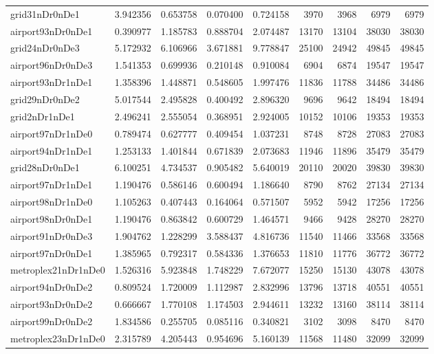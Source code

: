 \begin{longtable}{|l|r|r|r|r|r|r|r|r|}
grid31nDr0nDe1 & 3.942356 & 0.653758 & 0.070400 & 0.724158 & 3970 & 3968 & 6979 & 6979 \\
airport93nDr0nDe1 & 0.390977 & 1.185783 & 0.888704 & 2.074487 & 13170 & 13104 & 38030 & 38030 \\
grid24nDr0nDe3 & 5.172932 & 6.106966 & 3.671881 & 9.778847 & 25100 & 24942 & 49845 & 49845 \\
airport96nDr0nDe3 & 1.541353 & 0.699936 & 0.210148 & 0.910084 & 6904 & 6874 & 19547 & 19547 \\
airport93nDr1nDe1 & 1.358396 & 1.448871 & 0.548605 & 1.997476 & 11836 & 11788 & 34486 & 34486 \\
grid29nDr0nDe2 & 5.017544 & 2.495828 & 0.400492 & 2.896320 & 9696 & 9642 & 18494 & 18494 \\
grid2nDr1nDe1 & 2.496241 & 2.555054 & 0.368951 & 2.924005 & 10152 & 10106 & 19353 & 19353 \\
airport97nDr1nDe0 & 0.789474 & 0.627777 & 0.409454 & 1.037231 & 8748 & 8728 & 27083 & 27083 \\
airport94nDr1nDe1 & 1.253133 & 1.401844 & 0.671839 & 2.073683 & 11946 & 11896 & 35479 & 35479 \\
grid28nDr0nDe1 & 6.100251 & 4.734537 & 0.905482 & 5.640019 & 20110 & 20020 & 39830 & 39830 \\
airport97nDr1nDe1 & 1.190476 & 0.586146 & 0.600494 & 1.186640 & 8790 & 8762 & 27134 & 27134 \\
airport98nDr1nDe0 & 1.105263 & 0.407443 & 0.164064 & 0.571507 & 5952 & 5942 & 17256 & 17256 \\
airport98nDr0nDe1 & 1.190476 & 0.863842 & 0.600729 & 1.464571 & 9466 & 9428 & 28270 & 28270 \\
airport91nDr0nDe3 & 1.904762 & 1.228299 & 3.588437 & 4.816736 & 11540 & 11466 & 33568 & 33568 \\
airport97nDr0nDe1 & 1.385965 & 0.792317 & 0.584336 & 1.376653 & 11810 & 11776 & 36772 & 36772 \\
metroplex21nDr1nDe0 & 1.526316 & 5.923848 & 1.748229 & 7.672077 & 15250 & 15130 & 43078 & 43078 \\
airport94nDr0nDe2 & 0.809524 & 1.720009 & 1.112987 & 2.832996 & 13796 & 13718 & 40551 & 40551 \\
airport93nDr0nDe2 & 0.666667 & 1.770108 & 1.174503 & 2.944611 & 13232 & 13160 & 38114 & 38114 \\
airport99nDr0nDe2 & 1.834586 & 0.255705 & 0.085116 & 0.340821 & 3102 & 3098 & 8470 & 8470 \\
metroplex23nDr1nDe0 & 2.315789 & 4.205443 & 0.954696 & 5.160139 & 11568 & 11480 & 32099 & 32099 \\

\end{longtable}

